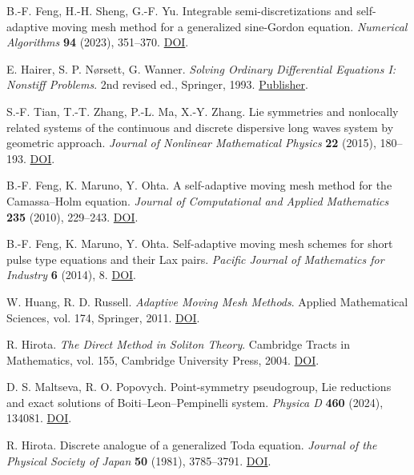 \documentclass{article}
\theoremstyle{plain}
\theoremstyle{definition}
\begin{document}
\begin{enumerate}[label={[\arabic*]},leftmargin=*,itemsep=1.5pt]
\item B.-F. Feng, H.-H. Sheng, G.-F. Yu. Integrable semi-discretizations and self-adaptive moving mesh method for a generalized sine-Gordon equation. \emph{Numerical Algorithms} \textbf{94} (2023), 351–370. \href{https://doi.org/10.1007/s11075-023-01504-1}{DOI}.
 
\item E. Hairer, S. P. Nørsett, G. Wanner. \emph{Solving Ordinary Differential Equations I: Nonstiff Problems}. 2nd revised ed., Springer, 1993. \href{https://link.springer.com/book/10.1007/978-3-540-78862-1}{Publisher}.
 
\item S.-F. Tian, T.-T. Zhang, P.-L. Ma, X.-Y. Zhang. Lie symmetries and nonlocally related systems of the continuous and discrete dispersive long waves system by geometric approach. \emph{Journal of Nonlinear Mathematical Physics} \textbf{22} (2015), 180–193. \href{https://doi.org/10.1080/14029251.2015.1023562}{DOI}.
 
\item B.-F. Feng, K. Maruno, Y. Ohta. A self-adaptive moving mesh method for the Camassa–Holm equation. \emph{Journal of Computational and Applied Mathematics} \textbf{235} (2010), 229–243. \href{https://doi.org/10.1016/j.cam.2010.05.044}{DOI}.
 
\item B.-F. Feng, K. Maruno, Y. Ohta. Self-adaptive moving mesh schemes for short pulse type equations and their Lax pairs. \emph{Pacific Journal of Mathematics for Industry} \textbf{6} (2014), 8. \href{https://doi.org/10.1186/s40736-014-0008-7}{DOI}.
 
\item W. Huang, R. D. Russell. \emph{Adaptive Moving Mesh Methods}. Applied Mathematical Sciences, vol. 174, Springer, 2011. \href{https://doi.org/10.1007/978-1-4419-7916-2}{DOI}.
 
\item R. Hirota. \emph{The Direct Method in Soliton Theory}. Cambridge Tracts in Mathematics, vol. 155, Cambridge University Press, 2004. \href{https://doi.org/10.1017/CBO9780511543043}{DOI}.
 

\item D. S. Maltseva, R. O. Popovych. Point-symmetry pseudogroup, Lie reductions and exact solutions of Boiti–Leon–Pempinelli system. \emph{Physica D} \textbf{460} (2024), 134081. \href{https://doi.org/10.1016/j.physd.2024.134081}{DOI}.


\item R. Hirota. Discrete analogue of a generalized Toda equation. \emph{Journal of the Physical Society of Japan} \textbf{50} (1981), 3785–3791. \href{https://doi.org/10.1143/JPSJ.50.3785}{DOI}.



\end{enumerate}
\end{document}
